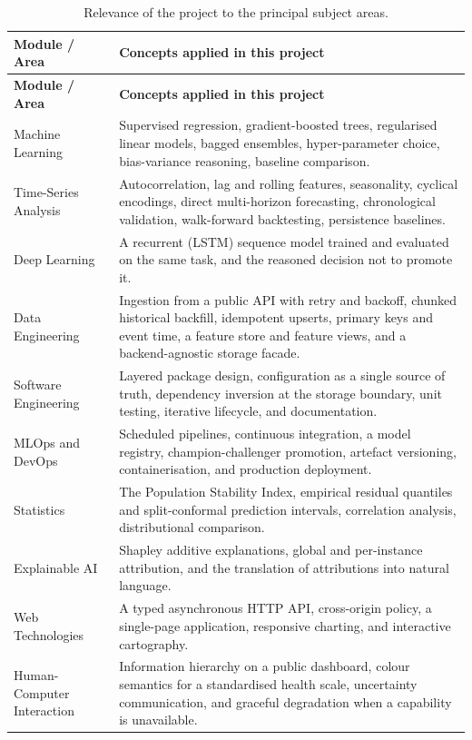 \begin{xltabular}{\textwidth}{Q{3.6cm} Y}
\caption{Relevance of the project to the principal subject areas.}\label{tab:relevance}\\
\toprule
\bfseries Module / Area & \bfseries Concepts applied in this project \\
\midrule
\endfirsthead
\toprule
\bfseries Module / Area & \bfseries Concepts applied in this project \\
\midrule
\endhead
\bottomrule
\endlastfoot
Machine Learning & Supervised regression, gradient-boosted trees, regularised
linear models, bagged ensembles, hyper-parameter choice, bias-variance
reasoning, baseline comparison. \\
Time-Series Analysis & Autocorrelation, lag and rolling features, seasonality,
cyclical encodings, direct multi-horizon forecasting, chronological validation,
walk-forward backtesting, persistence baselines. \\
Deep Learning & A recurrent (LSTM) sequence model trained and evaluated on the
same task, and the reasoned decision not to promote it. \\
Data Engineering & Ingestion from a public API with retry and backoff, chunked
historical backfill, idempotent upserts, primary keys and event time, a feature
store and feature views, and a backend-agnostic storage facade. \\
Software Engineering & Layered package design, configuration as a single source
of truth, dependency inversion at the storage boundary, unit testing, iterative
lifecycle, and documentation. \\
MLOps and DevOps & Scheduled pipelines, continuous integration, a model registry,
champion-challenger promotion, artefact versioning, containerisation, and
production deployment. \\
Statistics & The Population Stability Index, empirical residual quantiles and
split-conformal prediction intervals, correlation analysis, distributional
comparison. \\
Explainable AI & Shapley additive explanations, global and per-instance
attribution, and the translation of attributions into natural language. \\
Web Technologies & A typed asynchronous HTTP API, cross-origin policy, a
single-page application, responsive charting, and interactive cartography. \\
Human-Computer Interaction & Information hierarchy on a public dashboard,
colour semantics for a standardised health scale, uncertainty communication, and
graceful degradation when a capability is unavailable. \\
\end{xltabular}

